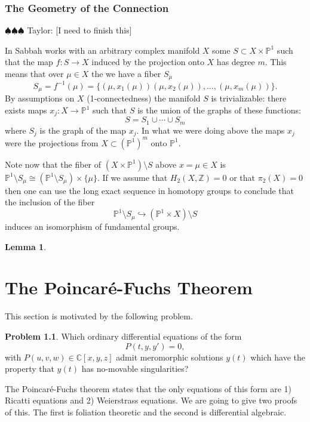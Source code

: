 \documentclass[12pt]{book}
\newcommand{\taylor}[1]{{\color{blue} \sf $\spadesuit\spadesuit\spadesuit$ Taylor: [#1]}}
\numberwithin{equation}{section}
\newtheorem{lemma}[theorem]{Lemma}
\theoremstyle{definition}
\newtheorem{problem}[theorem]{Problem}
\theoremstyle{remark}
\newcommand{\ZZ}{\mathbb{Z}}
\newcommand{\CC}{\mathbb{C}}
\newcommand{\PP}{\mathbb{P}}
\begin{document}
\subsection{The Geometry of the Connection}

\taylor{I need to finish this}

In \cite[VI, \S1, pg 192]{Sabbah2007} Sabbah works with an arbitrary complex manifold $X$ some $S \subset X\times \PP^1$ such that the map $f:S \to X$ induced by the projection onto $X$ has degree $m$. 
This means that over $\mu \in X$ the we have a fiber $S_{\mu}$
$$S_{\mu} = f^{-1}(\mu) = \lbrace (\mu,x_1(\mu)) (\mu,x_2(\mu)),\ldots,(\mu,x_m(\mu))\rbrace.$$ 
By assumptions on $X$ (1-connectedness) the manifold $S$ is trivializable: there exists maps $x_j: X \to \PP^1$ such that $S$ is the union of the graphs of these functions:
 $$ S=S_1 \cup \cdots \cup S_m $$
where $S_j$ is the graph of the map $x_j$.
In what we were doing above the maps $x_j$ were the projections from $X\subset (\PP^1)^m$ onto $\PP^1$.

Note now that the fiber of $(X\times \PP^1)\setminus S$ above $x=\mu\in X$ is $\PP^1\setminus S_{\mu} \cong (\PP^1\setminus S_{\mu}) \times \lbrace \mu \rbrace$.
If we assume that $H_2(X,\ZZ)=0$ or that $\pi_2(X)=0$ then one can use the long exact sequence in homotopy groups to conclude that the inclusion of the fiber 
 $$ \PP^1\setminus S_{\mu} \hookrightarrow (\PP^1\times X)\setminus S $$
induces an isomorphism of fundamental groups.
\begin{lemma}
	
\end{lemma}






\chapter[Poincar\'{e}-Fuchs]{The Poincar\'{e}-Fuchs Theorem}

This section is motivated by the following problem.
\begin{problem}
Which ordinary differential equations of the form
	  $$ P(t,y,y') =0, $$
with $P(u,v,w) \in \CC[x,y,z]$ admit meromorphic solutions $y(t)$ which have the property that $y(t)$ has no-movable singularities? 
\end{problem}
The Poincar\'e-Fuchs theorem states that the only equations of this form are 1) Ricatti equations and 2) Weierstrass equations. 
We are going to give two proofs of this. 
The first is foliation theoretic and the second is differential algebraic. 
\end{document}
